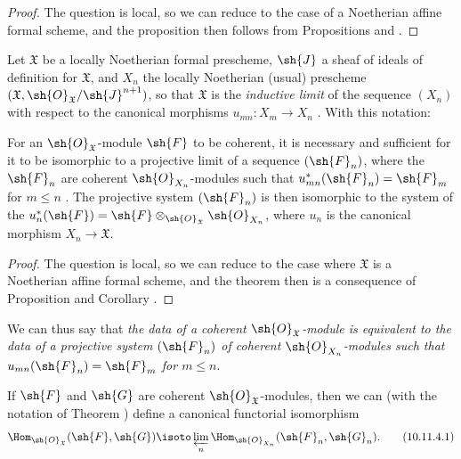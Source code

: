 \begin{proof}
The question is local, so we can reduce to the case of a Noetherian affine formal scheme, and the proposition then follows from Propositions  and .
\end{proof}

\begin{env}[10.11.2]
\label{I.10.11.2}
Let $\mathfrak{X}$ be a locally Noetherian formal prescheme, $\sh{J}$ a sheaf of ideals of definition for $\mathfrak{X}$, and $X_n$ the locally Noetherian (usual) prescheme $(\mathfrak{X},\sh{O}_\mathfrak{X}/\sh{J}^{n+1})$, so that $\mathfrak{X}$ is the \emph{inductive limit} of the sequence $(X_n)$ with respect to the canonical morphisms $u_{mn}:X_m\to X_n$ .
With this notation:
\end{env}

\begin{theorem}[10.11.3]
\label{I.10.11.3}
For an $\sh{O}_\mathfrak{X}$-module $\sh{F}$ to be coherent, it is necessary and sufficient for it to be isomorphic to a projective limit of a sequence $(\sh{F}_n)$, where the $\sh{F}_n$ are coherent $\sh{O}_{X_n}$-modules such that $u_{mn}^*(\sh{F}_n)=\sh{F}_m$ for $m\leq n$ .
The projective system $(\sh{F}_n)$ is then isomorphic to the system of the $u_n^*(\sh{F})=\sh{F}\otimes_{\sh{O}_\mathfrak{X}}\sh{O}_{X_n}$, where $u_n$ is the canonical morphism $X_n\to\mathfrak{X}$.
\end{theorem}

\begin{proof}
The question is local, so we can reduce to the case where $\mathfrak{X}$ is a Noetherian affine formal scheme, and the theorem then is a consequence of Proposition  and Corollary .
\end{proof}

We can thus say that \emph{the data of a coherent $\sh{O}_\mathfrak{X}$-module is equivalent to the data of a projective system $(\sh{F}_n)$ of coherent $\sh{O}_{X_n}$-modules such that $u_{mn}(\sh{F}_n)=\sh{F}_m$ for $m\leq n$}.

\begin{corollary}[10.11.4]
\label{I.10.11.4}
If $\sh{F}$ and $\sh{G}$ are coherent $\sh{O}_\mathfrak{X}$-modules, then we can (with the notation of Theorem ) define a canonical functorial isomorphism
\[
\label{I.10.11.4.1}
  \Hom_{\sh{O}_\mathfrak{X}}(\sh{F},\sh{G})\isoto\varprojlim_n\Hom_{\sh{O}_{X_n}}(\sh{F}_n,\sh{G}_n).
  \tag{10.11.4.1}
\]
\end{corollary}

